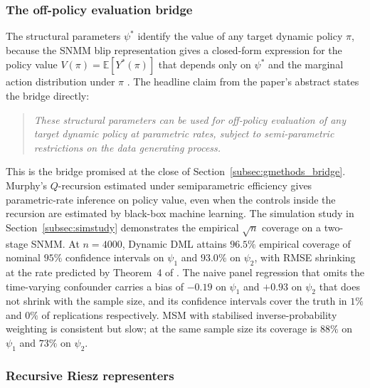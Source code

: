 \subsubsection*{The off-policy evaluation bridge}

The structural parameters $\psi^*$ identify the value of any target dynamic policy $\pi$, because the SNMM blip representation gives a closed-form expression for the policy value $V(\pi) = \mathbb{E}[Y^*(\pi)]$ that depends only on $\psi^*$ and the marginal action distribution under $\pi$ \citep[Section~6]{lewisSyrgkanis2021dynamicDML}. The headline claim from the paper's abstract states the bridge directly:
\begin{quote}
\itshape
These structural parameters can be used for off-policy evaluation of any target dynamic policy at parametric rates, subject to semi-parametric restrictions on the data generating process.
\end{quote}
This is the bridge promised at the close of Section~\ref{subsec:gmethods_bridge}. Murphy's $Q$-recursion estimated under semiparametric efficiency gives parametric-rate inference on policy value, even when the controls inside the recursion are estimated by black-box machine learning. The simulation study in Section~\ref{subsec:simstudy} demonstrates the empirical $\sqrt n$ coverage on a two-stage SNMM. At $n = 4000$, Dynamic DML attains $96.5\%$ empirical coverage of nominal $95\%$ confidence intervals on $\psi_1$ and $93.0\%$ on $\psi_2$, with RMSE shrinking at the rate predicted by Theorem~4 of \citet{lewisSyrgkanis2021dynamicDML}. The naive panel regression that omits the time-varying confounder carries a bias of $-0.19$ on $\psi_1$ and $+0.93$ on $\psi_2$ that does not shrink with the sample size, and its confidence intervals cover the truth in $1\%$ and $0\%$ of replications respectively. MSM with stabilised inverse-probability weighting is consistent but slow; at the same sample size its coverage is $88\%$ on $\psi_1$ and $73\%$ on $\psi_2$.

\subsubsection*{Recursive Riesz representers}

